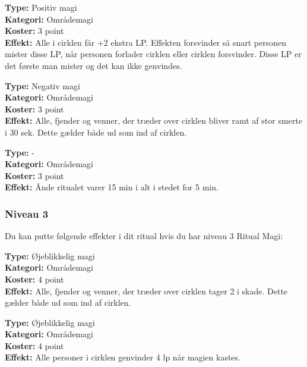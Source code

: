 \begin{ritual*}
\textbf{Type:} Positiv magi\\
\textbf{Kategori:} Områdemagi\\
\textbf{Koster:} 3 point\\
\textbf{Effekt:} Alle i cirklen får +2 ekstra LP. Effekten forsvinder så snart personen mister disse LP, når personen forlader cirklen eller cirklen forsvinder. Disse LP er det første man mister og det kan ikke genvindes.
\end{ritual*}

\begin{ritual*}
\textbf{Type:} Negativ magi\\
\textbf{Kategori:} Områdemagi\\
\textbf{Koster:} 3 point\\
\textbf{Effekt:}  Alle, fjender og venner, der træder over cirklen bliver ramt af stor smerte i 30 sek.  Dette gælder både ud som ind af cirklen.
\end{ritual*}

\begin{ritual*}
\textbf{Type:} -\\
\textbf{Kategori:} Områdemagi\\
\textbf{Koster:} 3 point\\
\textbf{Effekt:} Ånde ritualet varer 15 min i alt i stedet for 5 min.
\end{ritual*}

\subsubsection*{Niveau 3}
Du kan putte følgende effekter i dit ritual hvis du har niveau 3 Ritual Magi:

\begin{ritual*}
\textbf{Type:} Øjeblikkelig magi\\
\textbf{Kategori:} Områdemagi\\
\textbf{Koster:} 4 point\\
\textbf{Effekt:} Alle, fjender og venner, der træder over cirklen tager 2 i skade. Dette gælder både ud som ind af cirklen.
\end{ritual*}

\begin{ritual*}[Helbredelse 2]
\textbf{Type:} Øjeblikkelig magi\\
\textbf{Kategori:} Områdemagi\\
\textbf{Koster:} 4 point\\
\textbf{Effekt:} Alle personer i cirklen genvinder 4 lp når magien kastes.
\end{ritual*}

